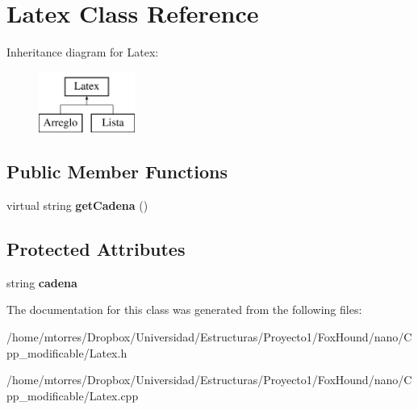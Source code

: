 \hypertarget{class_latex}{\section{Latex Class Reference}
\label{class_latex}
}
Inheritance diagram for Latex\-:\begin{figure}[H]
\begin{center}
\leavevmode
\includegraphics[height=2.000000cm]{class_latex}
\end{center}
\end{figure}
\subsection*{Public Member Functions}
\begin{DoxyCompactItemize}
\item 
\hypertarget{class_latex_ac2bec1a80e34877c5e9f3f091b5afe1a}{virtual string {\bfseries get\-Cadena} ()}\label{class_latex_ac2bec1a80e34877c5e9f3f091b5afe1a}

\end{DoxyCompactItemize}
\subsection*{Protected Attributes}
\begin{DoxyCompactItemize}
\item 
\hypertarget{class_latex_acfaf4978ad2bbd9064f1510995acd4bc}{string {\bfseries cadena}}\label{class_latex_acfaf4978ad2bbd9064f1510995acd4bc}

\end{DoxyCompactItemize}


The documentation for this class was generated from the following files\-:\begin{DoxyCompactItemize}
\item 
/home/mtorres/\-Dropbox/\-Universidad/\-Estructuras/\-Proyecto1/\-Fox\-Hound/nano/\-Cpp\-\_\-modificable/Latex.\-h\item 
/home/mtorres/\-Dropbox/\-Universidad/\-Estructuras/\-Proyecto1/\-Fox\-Hound/nano/\-Cpp\-\_\-modificable/Latex.\-cpp\end{DoxyCompactItemize}

